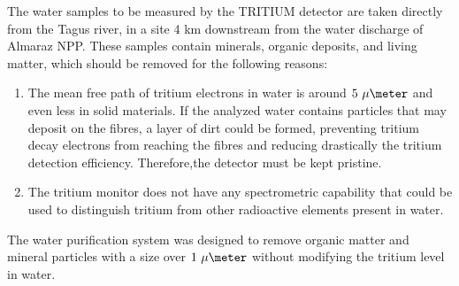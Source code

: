 The water samples to be measured by the TRITIUM detector are taken directly from the Tagus river, in a site 4 km downstream from the water discharge of Almaraz NPP. These samples contain minerals, organic deposits, and living matter, which should be removed for the following reasons:

\begin{enumerate}

\item{} The mean free path of tritium electrons in water is around $5~\mu\meter$ and even less in solid materials. If the analyzed water contains particles that may deposit on the fibres, a layer of dirt could be formed, preventing tritium decay electrons from reaching the fibres and reducing drastically the tritium detection efficiency. Therefore,the detector must be kept pristine.

\item{} The tritium monitor does not have any spectrometric capability that could be used to distinguish tritium from other radioactive elements present in water.

\end{enumerate}

The water purification system was designed to remove organic matter and mineral particles with a size over $1~\mu\meter$ without modifying the tritium level in water. 




